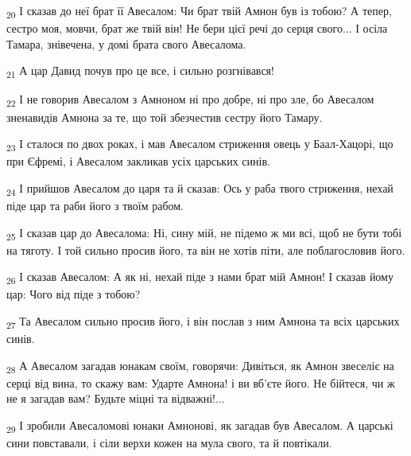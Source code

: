 \begin{tcolorbox}
\textsubscript{20} І сказав до неї брат її Авесалом: Чи брат твій Амнон був із тобою? А тепер, сестро моя, мовчи, брат же твій він! Не бери цієї речі до серця свого... І осіла Тамара, знівечена, у домі брата свого Авесалома.
\end{tcolorbox}
\begin{tcolorbox}
\textsubscript{21} А цар Давид почув про це все, і сильно розгнівався!
\end{tcolorbox}
\begin{tcolorbox}
\textsubscript{22} І не говорив Авесалом з Амноном ні про добре, ні про зле, бо Авесалом зненавидів Амнона за те, що той збезчестив сестру його Тамару.
\end{tcolorbox}
\begin{tcolorbox}
\textsubscript{23} І сталося по двох роках, і мав Авесалом стриження овець у Баал-Хацорі, що при Єфремі, і Авесалом закликав усіх царських синів.
\end{tcolorbox}
\begin{tcolorbox}
\textsubscript{24} І прийшов Авесалом до царя та й сказав: Ось у раба твого стриження, нехай піде цар та раби його з твоїм рабом.
\end{tcolorbox}
\begin{tcolorbox}
\textsubscript{25} І сказав цар до Авесалома: Ні, сину мій, не підемо ж ми всі, щоб не бути тобі на тяготу. І той сильно просив його, та він не хотів піти, але поблагословив його.
\end{tcolorbox}
\begin{tcolorbox}
\textsubscript{26} І сказав Авесалом: А як ні, нехай піде з нами брат мій Амнон! І сказав йому цар: Чого від піде з тобою?
\end{tcolorbox}
\begin{tcolorbox}
\textsubscript{27} Та Авесалом сильно просив його, і він послав з ним Амнона та всіх царських синів.
\end{tcolorbox}
\begin{tcolorbox}
\textsubscript{28} А Авесалом загадав юнакам своїм, говорячи: Дивіться, як Амнон звеселіє на серці від вина, то скажу вам: Ударте Амнона! і ви вб'єте його. Не бійтеся, чи ж не я загадав вам? Будьте міцні та відважні!...
\end{tcolorbox}
\begin{tcolorbox}
\textsubscript{29} І зробили Авесаломові юнаки Амнонові, як загадав був Авесалом. А царські сини повставали, і сіли верхи кожен на мула свого, та й повтікали.
\end{tcolorbox}

